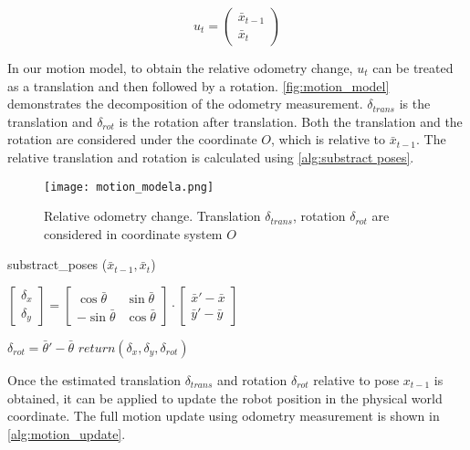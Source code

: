 \begin{equation}\label{eq:ut}
u_t = \begin{pmatrix}
\bar{x}_{t-1}\\ 
\bar{x}_{t}
\end{pmatrix}
\end{equation}

In our motion model, to obtain the relative odometry change, $u_t$ can be treated as a translation and then followed by a rotation. \autoref{fig:motion_model} demonstrates the decomposition of the odometry measurement. $\delta_{trans}$ is the translation and $\delta_{rot}$ is the rotation after translation. Both the translation and the rotation are considered under the coordinate $O$, which is relative to $\bar{x}_{t-1}$. The relative translation and rotation is calculated using \autoref{alg:substract poses}.

\begin{figure}[h!]
  \centering
  \texttt{[image: motion\_modela.png]}
  \caption{Relative odometry change. Translation $\delta_{trans}$, rotation $\delta_{rot}$ are considered in coordinate system $O$}
  \label{fig:motion_model}
\end{figure}

\begin{algorithm}                      
  \caption{substract\_poses ($\bar{x}_{t-1}, \bar{x}_{t}$)}         %
\label{alg:substract poses}                           
\begin{algorithmic}[1]  
\State $\begin{bmatrix}
\delta_{x}\\ 
\delta_{y}
\end{bmatrix}
=
\begin{bmatrix}
\cos{\bar{\theta}} & \sin{\bar{\theta}}\\ 
-\sin{\bar{\theta}} & \cos{\bar{\theta}}
\end{bmatrix}\cdot 
\begin{bmatrix}
\bar{x}' - \bar{x}\\ 
\bar{y}' - \bar{y}
\end{bmatrix}$

\State $\delta_{rot} = \bar{\theta}' - \bar{\theta}$
\State $return (\delta_{x}, \delta_{y}, \delta_{rot})$

\end{algorithmic}
\end{algorithm}

Once the estimated translation $\delta_{trans}$ and rotation $\delta_{rot}$ relative to pose $x_{t-1}$ is obtained, it can be applied to update the robot position in the physical world coordinate. The full motion update using odometry measurement is shown in \autoref{alg:motion_update}.

